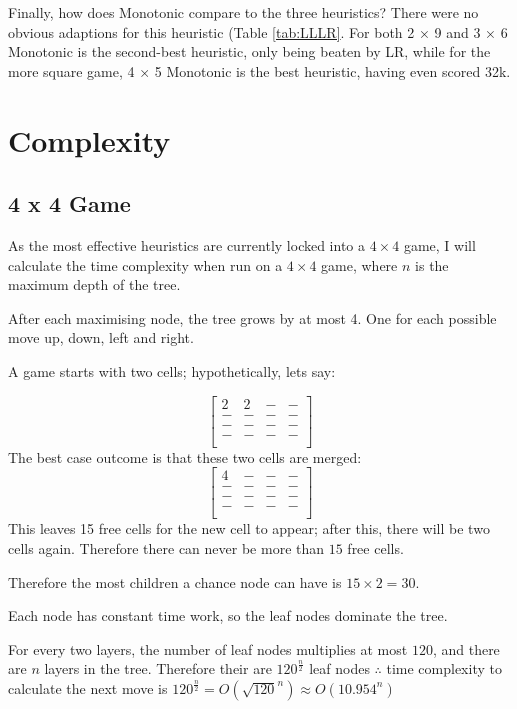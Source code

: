 \documentclass{article}
\begin{document}
Finally, how does Monotonic compare to the three heuristics? There were no obvious adaptions for this heuristic (Table \ref{tab:LLLR}. For both 2 × 9 and 3 × 6 Monotonic is the second-best heuristic, only being beaten by LR, while for the more square game, 4 × 5 Monotonic is the best heuristic, having even scored 32k.

\label{sec:complexity}
\section{Complexity}
\label{subsec:time_comp}
\subsection{4 x 4 Game}
As the most effective heuristics are currently locked into a $4\times4$ game, I will calculate the time complexity when run on a $4 \times 4$ game, where $n$ is the maximum depth of the tree.

After each maximising node, the tree grows by at most 4. One for each possible move up, down, left and right.

A game starts with two cells; hypothetically, let\textquotesingle s say:

\[
\begin{bmatrix}
    2&2&-&-\\
    -&-&-&-\\
    -&-&-&-\\
    -&-&-&-\\
\end{bmatrix}
\]
The best case outcome is that these two cells are merged:
\[
\begin{bmatrix}
    4&-&-&-\\
    -&-&-&-\\
    -&-&-&-\\
    -&-&-&-\\
\end{bmatrix}
\]
This leaves 15 free cells for the new cell to appear; after this, there will be two cells again.
Therefore there can never be more than $15$ free cells.

Therefore the most children a chance node can have is $15\times2=30$.



Each node has constant time work, so the leaf nodes dominate the tree.



For every two layers, the number of leaf nodes multiplies at most $120$, and there are $n$ layers in the tree. Therefore their are $120^\frac n 2$ leaf nodes
$\therefore$ time complexity to calculate the next move is $120^\frac n 2 = O(\sqrt{120}^n) \approx O(10.954^n)$
\end{document}
